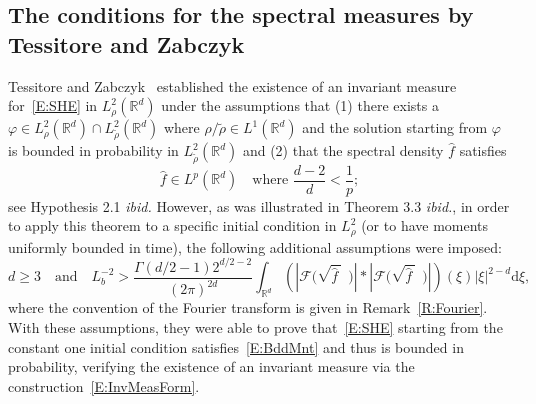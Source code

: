 \documentclass[a4paper,11pt]{article}%
\theoremstyle{plain}
\theoremstyle{definition}
\numberwithin{equation}{section}
\newcommand{\R}{\mathbb{R}}
\newcommand{\ud}{\ensuremath{\mathrm{d}}}
\begin{document}
\subsection{The conditions for the spectral measures by Tessitore and Zabczyk}\label{SS:TessZabz}

Tessitore and Zabczyk~\cite{tessitore.zabczyk:98:invariant} established the existence of an
invariant measure for~\eqref{E:SHE} in $L^2_{\rho}(\R^d)$ under the assumptions that (1) there
exists a $\varphi \in L^2_{\rho}(\R^d) \cap L^2_{\widetilde\rho}(\R^d)$ where $\rho/\widetilde\rho
\in L^1 (\R^d)$ and the solution starting from $\varphi$ is bounded in probability in
$L^2_{\widetilde \rho}(\R^d)$ and (2) that the spectral density $\hat{f}$ satisfies
\begin{equation}\label{E:CorTZ}
\widehat{f} \in L^p (\R^d) \quad \text{where $\frac{d-2}{d} < \frac{1}{p}$};
\end{equation}
see Hypothesis 2.1 \textit{ibid.} However, as was illustrated in Theorem 3.3 \textit{ibid.}, in
order to apply this theorem to a specific initial condition in $L^2_{\rho}$ (or to have moments
uniformly bounded in time), the following additional assumptions were imposed:
\begin{equation}\label{E:TZspec}
  d\ge 3 \quad \text{and} \quad
  L_b^{-2}> \frac{\Gamma(d/2 -1)2^{d/2-2}}{(2\pi)^{2d}} \int_{\R^d} \left(\left| \mathcal{F}\big(\sqrt{\widehat{f}\:}\:\:\big) \right| * \left| \mathcal{F}\big(\sqrt{\widehat{f}\:}\:\:\big)\right|\right) (\xi) |\xi|^{2-d} \ud \xi ,
\end{equation}
where the convention of the Fourier transform is given in Remark~\ref{R:Fourier}. With these
assumptions, they were able to prove that~\eqref{E:SHE} starting from the constant one initial
condition satisfies~\eqref{E:BddMnt} and thus is bounded in probability, verifying the existence of
an invariant measure via the construction~\eqref{E:InvMeasForm}.

\end{document}
